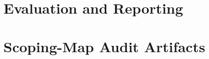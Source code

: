 \documentclass[11pt]{article}
\begin{document}
\FloatBarrier
\section{Evaluation and Reporting}
\label{sec:appendix-eval}






\FloatBarrier
\section{Scoping-Map Audit Artifacts}
\label{sec:audit-artifacts}






\FloatBarrier
\end{document}
